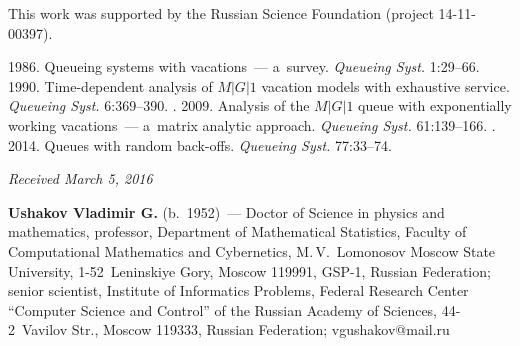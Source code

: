 


\Ack
\noindent
This work was supported by the Russian Science Foundation (project 14-11-00397).




  \begin{multicols}{2}

\renewcommand{\bibname}{\protect\rmfamily References}

{\small\frenchspacing
 {%
 \begin{thebibliography}{9}




 1986. 
Queueing systems with vacations~--- a~survey. \textit{Queueing Syst.} 1:29--66.
 1990. Time-dependent analysis of $M|G|1$ vacation models 
with exhaustive service. \textit{Queueing Syst.} 6:369--390.
. 2009. 
Analysis of the $M|G|1$ queue with exponentially working vacations~--- 
a~matrix analytic approach. \textit{Queueing Syst.} 61:139--166.
. 2014. 
Queues with random back-offs.  \textit{Queueing Syst.} 77:33--74. 
\end{thebibliography}

 }
 }

\end{multicols}

\vspace*{-3pt}

\hfill{\small\textit{Received March 5, 2016}}


\Contrl

\noindent
\textbf{Ushakov Vladimir G.} (b.\ 1952)~---
Doctor of Science in physics and mathematics, professor, Department of Mathematical 
Statistics, Faculty of Computational Mathematics and Cybernetics, M.\,V.~Lomonosov 
Moscow State University, 1-52~Leninskiye Gory, Moscow 119991, GSP-1, Russian 
Federation; senior scientist, Institute of Informatics Problems, Federal 
Research Center ``Computer Science and Control'' of the Russian Academy of Sciences, 
44-2~Vavilov Str., Moscow 119333, Russian Federation; \mbox{vgushakov@mail.ru} 

\label{end\stat}


\renewcommand{\bibname}{\protect\rm Литература}